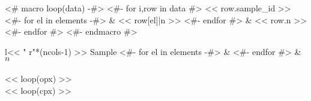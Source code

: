 <# macro loop(data) -#>
  <#- for i,row in data #>
    << row.sample_id >>
    <#- for el in elements -#>
    & << row[el]|n >>
    <#- endfor #> & << row.n >> \\
  <#- endfor #>
<#- endmacro #>
\begin{tabular}{l<< " r"*(ncols-1) >>}
\hline
  Sample
  <#- for el in elements -#>
  & 
  <#- endfor #> & $n$ \\
\hline
{} \\
\hline
<< loop(opx) >>
\hline
{} \\
\hline
<< loop(cpx) >>
\hline
\end{tabular}


